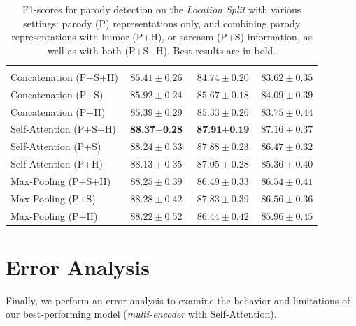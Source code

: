 \documentclass[11pt]{article}
\begin{document}
\begin{table}[!t]
{\begin{tabular}{ |l|c|c|c|}
\rowcolor[gray]{0.9} \multicolumn{4}{|l|}{\textbf{Multi-encoder (Ours)}}\\
\cellcolor[gray]{1}Concatenation (P+S+H) & $85.41\pm0.26$ & $84.74\pm0.20$ & $83.62\pm0.35$\\
\cellcolor[gray]{1}Concatenation (P+S) & $85.92\pm0.24$ & $85.67\pm0.18$ & $84.09\pm0.39$\\
\cellcolor[gray]{1}Concatenation (P+H) & $85.39\pm0.29$ & $85.33\pm0.26$ & $83.75\pm0.44$\\
\cellcolor[gray]{1}Self-Attention (P+S+H) & $\textbf{88.37}\pm\textbf{0.28}$ & $\textbf{87.91}\pm\textbf{0.19}$ & $87.16\pm0.37$\\ 
\cellcolor[gray]{1}Self-Attention (P+S) & $88.24\pm0.33$ & $87.88\pm0.23$ & $86.47\pm0.32$\\
\cellcolor[gray]{1}Self-Attention (P+H) & $88.13\pm0.35$ & $87.05\pm0.28$ & $85.36\pm0.40$\\
\cellcolor[gray]{1}Max-Pooling\hspace{0.44em}  (P+S+H) & $88.25\pm0.39$ & $86.49\pm0.33$ & $86.54\pm0.41$\\
\cellcolor[gray]{1}Max-Pooling\hspace{0.44em} (P+S) & $88.28\pm0.42$ & $87.83\pm0.39$ & $86.56\pm0.36$\\
\cellcolor[gray]{1}Max-Pooling\hspace{0.44em} (P+H) & $88.22\pm0.52$ & $86.44\pm0.42$ & $85.96\pm0.45$\\
\hline

\end{tabular}
}
\caption{
F1-scores for parody detection on the \emph{Location Split} with various settings: parody (P) representations only, and combining parody representations with humor (P+H), or sarcasm (P+S) information, as well as with both (P+S+H). Best results are in bold.}
\label{tab:location_complete}
\end{table}
\section{Error Analysis}

Finally, we perform an error analysis to examine the behavior and limitations of our best-performing model (\emph{multi-encoder} with Self-Attention). 
\end{document}
